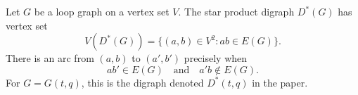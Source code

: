 \begin{definition}
Let \(G\) be a loop graph on a vertex set \(V\).  The star product digraph
\(D^*(G)\) has vertex set
\[
  V(D^*(G))=\{(a,b)\in V^2: ab\in E(G)\}.
\]
There is an arc from \((a,b)\) to \((a',b')\) precisely when
\[
  ab'\in E(G) \quad\text{and}\quad a'b\notin E(G).
\]
For \(G=G(t,q)\), this is the digraph denoted \(D^*(t,q)\) in the paper.
\end{definition}
